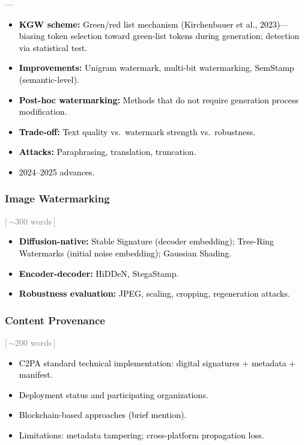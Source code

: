 ––\documentclass[preprint,12pt]{elsarticle}
\newcommand{\wordcount}[1]{\hfill\textcolor{gray}{\small[\,#1\,]}}
\newcommand{\outline}[1]{\textcolor{black}{#1}}
\begin{document}
\outline{%
\begin{itemize}[nosep,leftmargin=1.5em]
    \item \textbf{KGW scheme:} Green/red list mechanism (Kirchenbauer et al., 2023)---biasing token selection toward green-list tokens during generation; detection via statistical test.
    \item \textbf{Improvements:} Unigram watermark, multi-bit watermarking, SemStamp (semantic-level).
    \item \textbf{Post-hoc watermarking:} Methods that do not require generation process modification.
    \item \textbf{Trade-off:} Text quality vs.\ watermark strength vs.\ robustness.
    \item \textbf{Attacks:} Paraphrasing, translation, truncation.
    \item 2024--2025 advances.
\end{itemize}
}

\subsubsection{Image Watermarking} \wordcount{$\sim$300 words}

\outline{%
\begin{itemize}[nosep,leftmargin=1.5em]
    \item \textbf{Diffusion-native:} Stable Signature (decoder embedding); Tree-Ring Watermarks (initial noise embedding); Gaussian Shading.
    \item \textbf{Encoder-decoder:} HiDDeN, StegaStamp.
    \item \textbf{Robustness evaluation:} JPEG, scaling, cropping, regeneration attacks.
\end{itemize}
}

\subsubsection{Content Provenance} \wordcount{$\sim$200 words}

\outline{%
\begin{itemize}[nosep,leftmargin=1.5em]
    \item C2PA standard technical implementation: digital signatures + metadata + manifest.
    \item Deployment status and participating organizations.
    \item Blockchain-based approaches (brief mention).
    \item Limitations: metadata tampering; cross-platform propagation loss.
\end{itemize}
}
\end{document}

